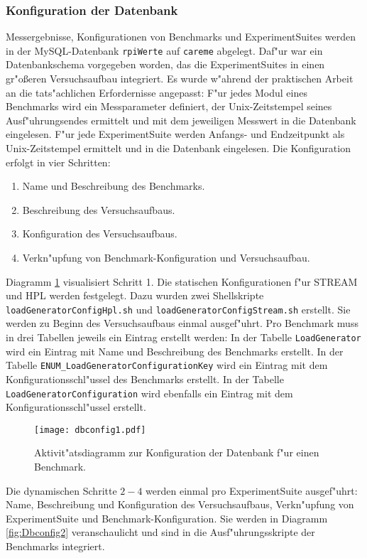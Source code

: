 \subsubsection{Konfiguration der Datenbank}

Messergebnisse, Konfigurationen von Benchmarks und ExperimentSuites werden in der MySQL-Datenbank \texttt{rpiWerte} auf \texttt{careme} abgelegt. Daf"ur war ein Datenbankschema vorgegeben worden, das die ExperimentSuites in einen gr"o\ss eren Versuchsaufbau integriert. Es wurde w"ahrend der praktischen Arbeit an die tats"achlichen Erfordernisse angepasst: F"ur jedes Modul eines Benchmarks wird ein Messparameter definiert, der Unix-Zeitstempel seines Ausf"uhrungsendes ermittelt und mit dem jeweiligen Messwert in die Datenbank eingelesen. F"ur jede ExperimentSuite werden Anfangs- und Endzeitpunkt als Unix-Zeitstempel ermittelt und in die Datenbank eingelesen. Die Konfiguration erfolgt in vier Schritten:  
\begin{enumerate}\bfseries
	\item Name und Beschreibung des Benchmarks. 
	\item Beschreibung des Versuchsaufbaus. 
	\item Konfiguration des Versuchsaufbaus. 
	\item Verkn"upfung von Benchmark-Konfiguration und Versuchsaufbau.
\end{enumerate} 
Diagramm \ref{fig:Dbconfig1} visualisiert Schritt 1. Die statischen Konfigurationen f"ur STREAM und HPL werden festgelegt. Dazu wurden zwei Shellskripte \texttt{loadGeneratorCon\-figHpl.sh} und \texttt{loadGe\-nerator\-ConfigStream.sh} erstellt. Sie werden zu Beginn des Versuchsaufbaus einmal ausgef"uhrt. Pro Benchmark muss in drei Tabellen jeweils ein Eintrag erstellt werden: In der Tabelle \texttt{LoadGenerator} wird ein Eintrag mit Name und Beschreibung des Benchmarks erstellt. In der Tabelle \texttt{ENUM\_LoadGeneratorConfigura\-tionKey} wird ein Eintrag mit dem Konfigurationsschl"ussel des Benchmarks erstellt. In der Tabelle \texttt{LoadGeneratorConfiguration} wird ebenfalls ein Eintrag mit dem Konfigurationsschl"ussel erstellt.
\begin{figure}[htb]
\centering
\texttt{[image: dbconfig1.pdf]}
\caption{Aktivit"atsdiagramm zur Konfiguration der Datenbank f"ur einen Benchmark.}
\label{fig:Dbconfig1}
\end{figure}
Die dynamischen Schritte $2-4$ werden einmal pro ExperimentSuite ausgef"uhrt: Name, Beschreibung und Konfiguration des Versuchsaufbaus, Verkn"upfung von ExperimentSuite und Benchmark-Konfiguration. Sie werden in Diagramm \ref{fig:Dbconfig2} veranschaulicht und sind in die Ausf"uhrungsskripte der Benchmarks integriert. 

